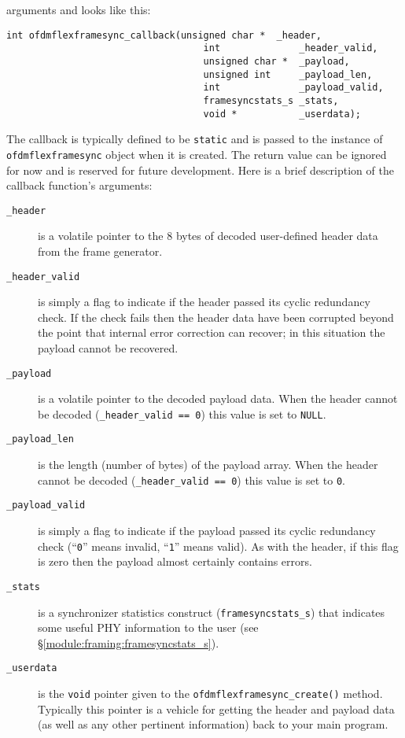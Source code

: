 arguments and looks like this:
%
\begin{Verbatim}[fontsize=\small]
    int ofdmflexframesync_callback(unsigned char *  _header,
                                   int              _header_valid,
                                   unsigned char *  _payload,
                                   unsigned int     _payload_len,
                                   int              _payload_valid,
                                   framesyncstats_s _stats,
                                   void *           _userdata);
\end{Verbatim}
%
The callback is typically defined to be {\tt static} and is passed to
the instance of {\tt ofdmflexframesync} object when it is created.
The return value can be ignored for now and is reserved for future
development.
Here is a brief description of the callback function's arguments:
%
\begin{description}
\item[{\tt \_header}]
    is a volatile pointer to the 8 bytes of decoded user-defined header
    data from the frame generator.
\item[{\tt \_header\_valid}]
    is simply a flag to indicate if the header passed its cyclic
    redundancy check.
    If the check fails then the header data have been corrupted beyond
    the point that internal error correction can recover;
    in this situation the payload cannot be recovered.
\item[{\tt \_payload}]
    is a volatile pointer to the decoded payload data.
    When the header cannot be decoded ({\tt \_header\_valid == 0})
    this value is set to {\tt NULL}.
\item[{\tt \_payload\_len}]
    is the length (number of bytes) of the payload array.
    When the header cannot be decoded ({\tt \_header\_valid == 0})
    this value is set to {\tt 0}.
\item[{\tt \_payload\_valid}]
    is simply a flag to indicate if the payload passed its cyclic
    redundancy check
    (``{\tt 0}'' means invalid, ``{\tt 1}'' means valid).
    As with the header,
    if this flag is zero then the payload almost certainly contains
    errors.
\item[{\tt \_stats}]
    is a synchronizer statistics construct
    ({\tt framesyncstats\_s})
    that indicates some useful PHY information to the user
    (see \S\ref{module:framing:framesyncstats_s}).
\item[{\tt \_userdata}]
    is the {\tt void} pointer given to the
    {\tt ofdmflexframesync\_create()} method.
    Typically this pointer is a vehicle for getting the header and
    payload data (as well as any other pertinent information)
    back to your main program.
\end{description}
%

